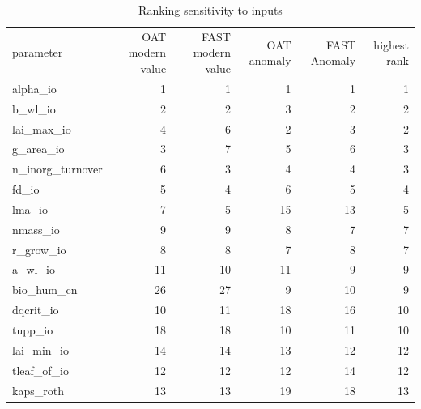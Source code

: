 \documentclass[gmd, manuscript]{copernicus}
\begin{document}
\begin{table}[t]
\caption{Ranking sensitivity to inputs}
\label{table:sens_rank_total}
\begin{tabular}{l r r r r r}
\tophline
parameter & OAT modern value & FAST modern value & OAT anomaly & FAST Anomaly & highest rank \\ 
\middlehline
alpha\_io            &            1          &       1      &      1      &       1    &     1 \\ 
b\_wl\_io              &            2        &          2     &       3   &          2    &     2 \\ 
lai\_max\_io           &            4      &             6    &        2    &         3    &     2 \\ 
g\_area\_io            &            3      &            7     &       5   &          6    &      3 \\ 
n\_inorg\_turnover     &            6      &            3     &       4     &        4    &     3 \\ 
fd\_io                &            5      &            4     &       6   &          5    &     4 \\ 
lma\_io               &            7      &            5     &      15     &       13    &     5 \\ 
nmass\_io             &            9      &            9     &       8      &       7    &     7 \\ 
r\_grow\_io            &            8      &            8     &       7       &      8    &     7 \\ 
a\_wl\_io              &           11      &           10     &      11       &      9    &     9 \\ 
bio\_hum\_cn           &           26      &           27     &       9   &         10    &     9 \\ 
dqcrit\_io            &           10      &           11     &      18   &         16    &    10 \\ 
tupp\_io              &           18      &           18     &      10   &         11    &    10 \\ 
lai\_min\_io           &           14      &           14     &      13 &           12    &    12 \\ 
tleaf\_of\_io          &           12     &            12     &      12   &         14    &    12 \\ 
kaps\_roth            &           13      &           13     &      19    &        18    &    13 \\ 

\end{tabular}
\end{table}
\end{document}
